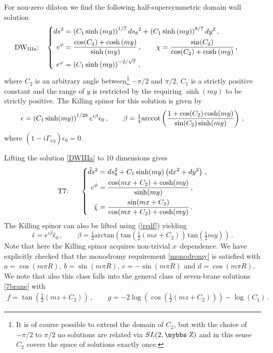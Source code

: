 \documentclass[12pt,a4paper]{article}
\def\bbs#1{\hbox{\mybbs#1}}
\begin{document}
For non-zero dilaton we find the following half-supersymmetric
domain wall solution
\begin{equation}
  \text{DW$_{\text{IIIa}}$:~~~}\left\{\begin{aligned}
  ds^2 & =  \left(C_1 \sinh{(my)}\right)^{1/7}ds_8{}^2 +
     \left(C_1 \sinh{(my)}\right)^{8/7}dy^2 \,, \hskip 1.5truecm\\
  e^\phi & = {\cos(C_2)+\cosh{(m y)}\over \sinh{(m y)}}\,,\qquad
  \chi = {\sin(C_2) \over \cos(C_2) +\cosh{(m y)}}\,, \\
  e^\varphi & = \left(C_1 \sinh{(m y)}\right)^{-2/\sqrt 7} \,,
\end{aligned}\right.
\label{DWIIIa}
\end{equation}
where $C_2$ is an arbitrary angle between\footnote{It is of course
possible to extend the domain of $C_2$, but with the choice of
$-\pi/2$ to $\pi/2$ no solutions are related via $SL(2,\bbs{Z})$
and in this sense $C_2$ covers the space of solutions exactly
once.} $-\pi/2$ and $\pi/2$, $C_1$ is a strictly positive constant
and the range of $y$ is restricted by the requiring $\sinh(m y)$
to be strictly positive. The Killing spinor for this solution is
given by
\begin{equation}
  \epsilon=\left(C_1 \sinh(my)\right)^{1/28}e^{i\beta}\epsilon_0\, , \qquad
  \beta = \tfrac{1}{4} \text{arccot}\left(1+\cos(C_2) \cosh(my)
    \over \sin(C_2) \sinh(my)\right) \, ,
\end{equation}
where $(1-i\Gamma_{\underline{xy}})\epsilon_0=0$.

Lifting the solution \eqref{DWIIIa} to 10 dimensions gives
\begin{equation}
\text{T7:~~~~~}\left\{\begin{aligned}
\hat{d}s^2 & = ds_8^2 + C_1 \sinh(m y) \left(dx^2+ dy^2\right)\,,\\
e^{\hat\phi} & = {\cos(m x+C_2)+\cosh(m y)\over\sinh(m y)}\,,\label{classIIID10gen}\\
\hat\chi & = {\sin(m x+C_2)\over\cos(m x + C_2)+\cosh(m y)}\,.
\end{aligned}\right.
\end{equation}
The Killing spinor can also be lifted using (\ref{redf}) yielding
\begin{equation}
  \hat \epsilon = e^{i \beta}  \hat \epsilon_0 \,, \qquad
  \beta = \tfrac{1}{2} \text{arctan} \left( \text{tan}(\tfrac{1}{2}(mx+C_2)) \,
  \text{tan}(\tfrac{1}{2}my) \right) \,.
\end{equation}
Note that here the Killing spinor acquires non-trivial $x$--dependence.
We have explicitly checked that the monodromy requirement \eqref{monodromy}
is satisfied with $a = \cos(m\pi R),\ b= \sin(m\pi R),\ c = -\sin(m\pi R)$
and $d = \cos(m\pi R)$.
We note that also this class falls into the general class of
seven-brane solutions \eqref{7brane} with
\begin{align}
  f = \tan\left(\tfrac{1}{2}(m z +C_2)\right)\,, \qquad
  g = -2\log\left(\cos(\tfrac{1}{2}(mz+C_2))\right)-\log(C_1) \,.
\end{align}
\end{document}
